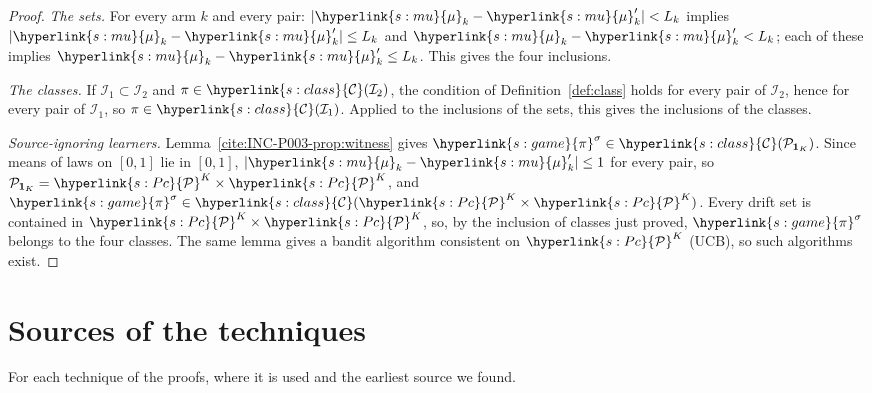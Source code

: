 \documentclass[11pt]{article}
\newcommand{\sy}[2]{\hyperlink{#1}{#2}}
\newcommand{\Pc}{\sy{s:Pc}{\mathcal{P}}}
\newcommand{\mean}{\sy{s:mu}{\mu}}
\newcommand{\pis}{\sy{s:game}{\pi}^{\sigma}}
\newcommand{\Cl}{\sy{s:class}{\mathcal{C}}}
\begin{document}
\begin{proof}
\emph{The sets.} For every arm $k$ and every pair: $|\mean_k-\mean'_k|<L_k$ implies
$|\mean_k-\mean'_k|\le L_k$ and $\mean_k-\mean'_k<L_k$; each of these implies
$\mean_k-\mean'_k\le L_k$. This gives the four inclusions.

\emph{The classes.} If $\mathcal I_1\subset\mathcal I_2$ and $\pi\in\Cl(\mathcal I_2)$, the
condition of Definition~\ref{def:class} holds for every pair of $\mathcal I_2$, hence for every pair
of $\mathcal I_1$, so $\pi\in\Cl(\mathcal I_1)$. Applied to the inclusions of the sets, this gives
the inclusions of the classes.

\emph{Source-ignoring learners.} Lemma~\ref{cite:INC-P003-prop:witness} gives
$\pis\in\Cl(\mathcal P_{\mathbf 1_K})$. Since means of laws on $[0,1]$ lie in $[0,1]$,
$|\mean_k-\mean'_k|\le1$ for every pair, so $\mathcal P_{\mathbf 1_K}=\Pc^K\times\Pc^K$, and
$\pis\in\Cl(\Pc^K\times\Pc^K)$. Every drift set is contained in $\Pc^K\times\Pc^K$, so, by the
inclusion of classes just proved, $\pis$ belongs to the four classes. The same lemma gives a bandit
algorithm consistent on $\Pc^K$ (UCB), so such algorithms exist.
\end{proof}

\section{Sources of the techniques}\label{sec:attribution}

For each technique of the proofs, where it is used and the earliest source we found.
\end{document}
